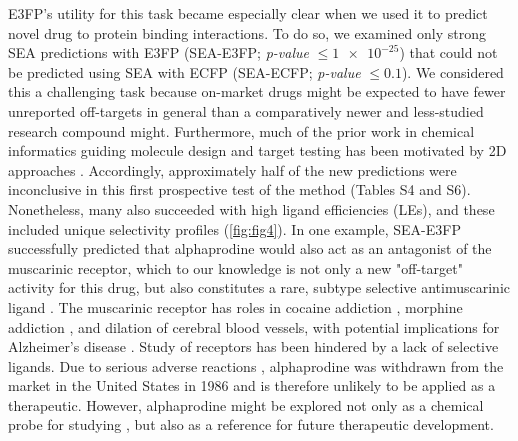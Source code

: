 \documentclass[../main.tex]{subfiles}
\begin{document}
\begin{refsection}
E3FP's utility for this task became especially clear when we used it to predict novel drug to protein binding interactions.
To do so, we examined only strong SEA predictions with E3FP (SEA-E3FP;   \emph{p-value} $\le \num{1e-25}$) that could not be predicted using SEA with ECFP (SEA-ECFP; \emph{p-value} $\le 0.1$).
We considered this a challenging task because on-market drugs might be expected to have fewer unreported off-targets in general than a comparatively newer and less-studied research compound might.
Furthermore, much of the prior work in chemical informatics guiding molecule design and target testing has been motivated by 2D approaches \cite{nicholls_2010,maggiora_2014,cleves_2008}.
Accordingly, approximately half of the new predictions were inconclusive in this first prospective test of the method (Tables S4 and S6).
Nonetheless, many also succeeded with high ligand efficiencies (LEs), and these included unique selectivity profiles (\cref{fig:fig4}).
In one example, SEA-E3FP successfully predicted that alphaprodine would also act as an antagonist of the  muscarinic receptor, which to our knowledge is not only a new "off-target" activity for this drug, but also constitutes a rare, subtype selective  antimuscarinic ligand \cite{gentry_2014}.
The  muscarinic receptor has roles in cocaine addiction \cite{finkjensen_2003}, morphine addiction \cite{basile_2002}, and dilation of cerebral blood vessels, with potential implications for Alzheimer's disease  \cite{yamada_2001}.
Study of  receptors has been hindered by a lack of selective ligands.
Due to serious adverse reactions \cite{chen_1982}, alphaprodine was withdrawn from the market in the United States in 1986 and is therefore unlikely to be applied as a therapeutic.
However, alphaprodine might be explored not only as a chemical probe for studying , but also as a reference for future therapeutic development.


\end{refsection}
\end{document}
